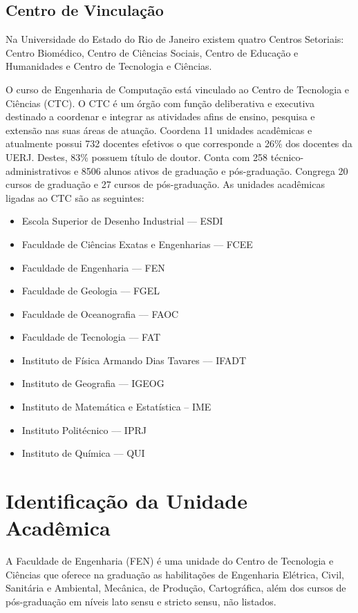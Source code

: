 \subsection{Centro de Vinculação}

Na Universidade do Estado do Rio de Janeiro existem quatro Centros Setoriais: Centro Biomédico, Centro de Ciências Sociais, Centro de Educação e Humanidades e Centro de Tecnologia e Ciências.

O curso de Engenharia de Computação está vinculado ao Centro de Tecnologia e Ciências (CTC).
O CTC é um órgão com função deliberativa e executiva destinado a coordenar e integrar as atividades afins de ensino, pesquisa e extensão nas suas áreas de atuação. Coordena 11 unidades acadêmicas e atualmente possui 732 docentes efetivos o que corresponde a 26\% dos docentes da UERJ. Destes, 83\% possuem título de doutor. Conta com 258 técnico-administrativos e 8506 alunos ativos de graduação e pós-graduação. Congrega 20 cursos de graduação e 27 cursos de pós-graduação. As unidades acadêmicas ligadas ao CTC são as seguintes:

\begin{itemize}

	\item Escola Superior de Desenho Industrial –-- ESDI
	\item Faculdade de Ciências Exatas e Engenharias –-- FCEE
	\item Faculdade de Engenharia –-- FEN
	\item Faculdade de Geologia –-- FGEL
	\item Faculdade de Oceanografia –-- FAOC
	\item Faculdade de Tecnologia –-- FAT
	\item Instituto de Física Armando Dias Tavares –-- IFADT
	\item Instituto de Geografia –-- IGEOG
	\item Instituto de Matemática e Estatística – IME
	\item Instituto Politécnico –-- IPRJ
	\item Instituto de Química –-- QUI

\end{itemize}

\section{Identificação da Unidade Acadêmica}

A Faculdade de Engenharia (FEN) é uma unidade do Centro de Tecnologia e Ciências que oferece na graduação as habilitações de Engenharia Elétrica, Civil, Sanitária e Ambiental, Mecânica, de Produção, Cartográfica, além dos cursos de pós-graduação em níveis lato sensu e stricto sensu, não listados.

